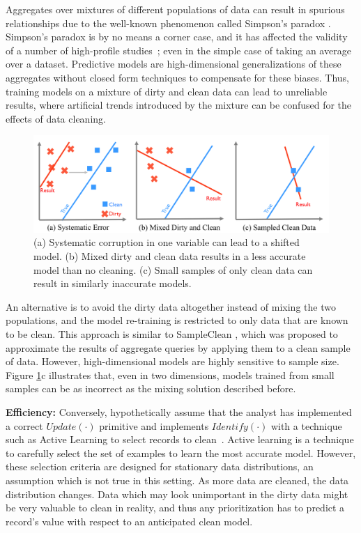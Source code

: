 Aggregates over mixtures of different populations of data can result in spurious relationships due to the well-known phenomenon called Simpson's paradox \cite{simpson1951interpretation}.
Simpson's paradox is by no means a corner case, and it has affected the validity of a number of high-profile studies~\cite{simpsonsparadox}; even in the simple case of taking an average over a dataset.
Predictive models are high-dimensional generalizations of these aggregates without closed form techniques to compensate for these biases.
Thus, training models on a mixture of dirty and clean data can lead to unreliable results, where artificial trends introduced by the mixture can be confused for the effects of data cleaning.

\begin{figure}[ht!]
\centering
 \includegraphics[width=\columnwidth]{figs/update-arch.png}
 \caption{(a) Systematic corruption in one variable can lead to a shifted model. 
 (b) Mixed dirty and clean data results in a less accurate model than no cleaning.
(c) Small samples of only clean data can result in similarly inaccurate models. \label{update-arch1}}
\end{figure}

An alternative is to avoid the dirty data altogether instead of mixing the two populations, and the model re-training is restricted to only data that are known to be clean.
This approach is similar to SampleClean \cite{wang1999sample}, which was proposed to approximate the results of aggregate queries by applying them to a clean sample of data.
However, high-dimensional models are highly sensitive to sample size.
Figure \ref{update-arch1}c illustrates that, even in two dimensions, models trained from small samples can be as incorrect as the mixing solution described before.

\vspace{0.5em} 

\textbf{Efficiency: } Conversely, hypothetically assume that the analyst has implemented a correct $Update(\cdot)$ primitive and implements $Identify(\cdot)$ with a technique such as Active Learning to select records to clean~\cite{yakout2013don,DBLP:journals/pvldb/YakoutENOI11,gokhale2014corleone}.
Active learning is a technique to carefully select the set of examples to learn the most accurate model.
However, these selection criteria are designed for stationary data distributions, an assumption which is not true in this setting.
As more data are cleaned, the data distribution changes.
Data which may look unimportant in the dirty data might be very valuable to clean in reality, and thus any prioritization has to predict a record's value with respect to an anticipated clean model.

